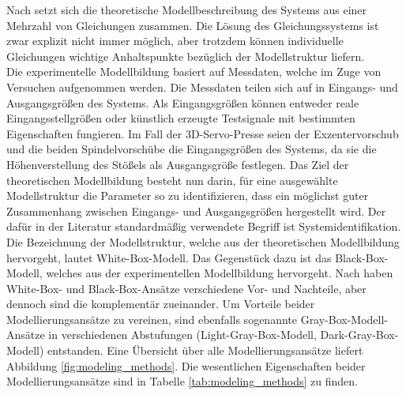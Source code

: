 Nach \cite{Isermann.2011} setzt sich die theoretische Modellbeschreibung des Systems aus einer Mehrzahl von Gleichungen zusammen. Die Lösung des Gleichungssystems ist zwar explizit nicht immer möglich, aber trotzdem können individuelle Gleichungen wichtige Anhaltspunkte bezüglich der Modellstruktur liefern. \cite{Isermann.2011} \\
Die experimentelle Modellbildung basiert auf Messdaten, welche im Zuge von Versuchen aufgenommen werden. Die Messdaten teilen sich auf in Eingangs- und Ausgangsgrößen des Systems. Als Eingangsgrößen können entweder reale Eingangsstellgrößen oder künstlich erzeugte Testsignale mit bestimmten Eigenschaften fungieren. Im Fall der 3D-Servo-Presse seien der Exzentervorschub und die beiden Spindelvorschübe die Eingangsgrößen des Systems, da sie die Höhenverstellung des Stößels als Ausgangsgröße festlegen. Das Ziel der theoretischen Modellbildung besteht nun darin, für eine ausgewählte Modellstruktur die Parameter so zu identifizieren, dass ein möglichst guter Zusammenhang zwischen Eingangs- und Ausgangsgrößen hergestellt wird. Der dafür in der Literatur standardmäßig verwendete Begriff ist Systemidentifikation. \cite{Isermann.2011} \\
Die Bezeichnung der Modellstruktur, welche aus der theoretischen Modellbildung hervorgeht, lautet White-Box-Modell. Das Gegenstück dazu ist das Black-Box-Modell, welches aus der experimentellen Modellbildung hervorgeht. Nach \cite{Isermann.2011} haben White-Box- und Black-Box-Ansätze verschiedene Vor- und Nachteile, aber dennoch sind die komplementär zueinander. Um Vorteile beider Modellierungsansätze zu vereinen, sind ebenfalls sogenannte Gray-Box-Modell-Ansätze in verschiedenen Abstufungen (Light-Gray-Box-Modell, Dark-Gray-Box-Modell) entstanden. Eine Übersicht über alle Modellierungsansätze liefert Abbildung \ref{fig:modeling_methods}. Die wesentlichen Eigenschaften beider Modellierungsansätze sind in Tabelle \ref{tab:modeling_methods} zu finden. 




